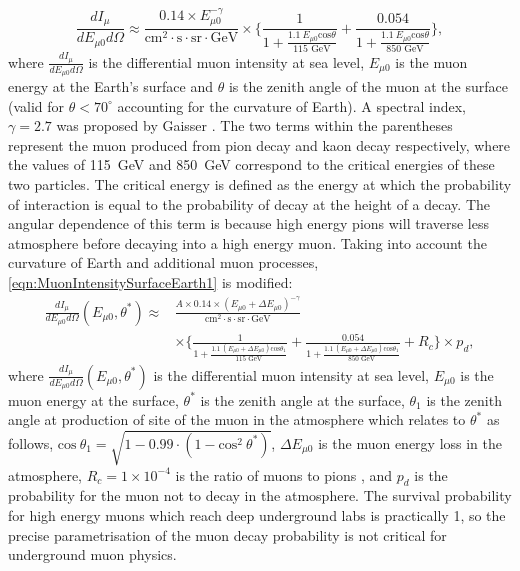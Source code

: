 \begin{equation}
    \label{eqn:MuonIntensitySurfaceEarth1}
    \frac{dI_\mu}{dE_{\mu0}d\Omega}\approx\frac{0.14\times E^{-\gamma}_{\mu0}}{\text{cm}^2\cdot\text{s}\cdot\text{sr}\cdot\text{GeV}}\times\Biggl\{\frac{1}{1+\frac{1.1\:E_{\mu0}\text{cos}\theta}{115\text{ GeV}}}+\frac{0.054}{1+\frac{1.1\:E_{\mu0}\text{cos}\theta}{850\text{ GeV}}}\Biggl\},
\end{equation}
where $\frac{dI_\mu}{dE_{\mu0}d\Omega}$ is the differential muon intensity at sea level, $E_{\mu0}$ is the muon energy at the Earth's surface and $\theta$ is the zenith angle of the muon at the surface (valid for $\theta<70^\circ$ accounting for the curvature of Earth). A spectral index, $\gamma=2.7$ was proposed by Gaisser \cite{Gaisser_Engel_Resconi_2016}. The two terms within the parentheses represent the muon produced from pion decay and kaon decay respectively, where the values of 115~GeV and 850~GeV correspond to the critical energies of these two particles. The critical energy is defined as the energy at which the probability of interaction is equal to the probability of decay at the height of a decay. The angular dependence of this term is because high energy pions will traverse less atmosphere before decaying into a high energy muon.
Taking into account the curvature of Earth and additional muon processes, \autoref{eqn:MuonIntensitySurfaceEarth1} is modified:
\begin{equation}
\label{eqn:MuonIntensitySurfaceEarth2}
\begin{split}    
    \frac{dI_\mu}{dE_{\mu0}d\Omega}(E_{\mu0},\theta^*)\approx&\frac{A\times 0.14\times (E_{\mu0}+\Delta E_{\mu0})^{-\gamma}}{\text{cm}^2\cdot\text{s}\cdot\text{sr}\cdot\text{GeV}}\\
    &\times\Biggl\{\frac{1}{1+\frac{1.1\:(E_{\mu0}+\Delta E_{\mu0})\text{cos}\theta_1}{115\text{ GeV}}}+\frac{0.054}{1+\frac{1.1\:(E_{\mu0}+\Delta E_{\mu0})\text{cos}\theta_1}{850\text{ GeV}}}+R_c\Biggl\}\times p_d,
\end{split}
\end{equation}
where $\frac{dI_\mu}{dE_{\mu0}d\Omega}(E_{\mu0},\theta^*)$ is the differential muon intensity at sea level, $E_{\mu0}$ is the muon energy at the surface, $\theta^*$ is the zenith angle at the surface, $\theta_1$ is the zenith angle at production of site of the muon in the atmosphere which relates to $\theta^*$ as follows, $\text{cos}\:\theta_1=\sqrt{1-0.99\cdot(1-\text{cos}^2\:\theta^*)}$, $\Delta E_{\mu0}$ is the muon energy loss in the atmosphere, $R_c=1\times10^{-4}$ is the ratio of muons to pions \cite{LVD:1998lir}, and $p_d$ is the probability for the muon not to decay in the atmosphere. The survival probability for high energy muons which reach deep underground labs is practically 1, so the precise parametrisation of the muon decay probability is not critical for underground muon physics.

